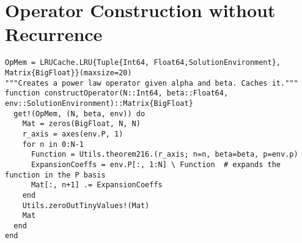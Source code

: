 \pagebreak
\section{Operator Construction without Recurrence}
\begin{verbatim}
OpMem = LRUCache.LRU{Tuple{Int64, Float64,SolutionEnvironment}, Matrix{BigFloat}}(maxsize=20)
"""Creates a power law operator given alpha and beta. Caches it."""
function constructOperator(N::Int64, beta::Float64, env::SolutionEnvironment)::Matrix{BigFloat}
  get!(OpMem, (N, beta, env)) do
    Mat = zeros(BigFloat, N, N)
    r_axis = axes(env.P, 1)
    for n in 0:N-1
      Function = Utils.theorem216.(r_axis; n=n, beta=beta, p=env.p)
      ExpansionCoeffs = env.P[:, 1:N] \ Function  # expands the function in the P basis
      Mat[:, n+1] .= ExpansionCoeffs
    end
    Utils.zeroOutTinyValues!(Mat)
    Mat
  end
end
\end{verbatim}
